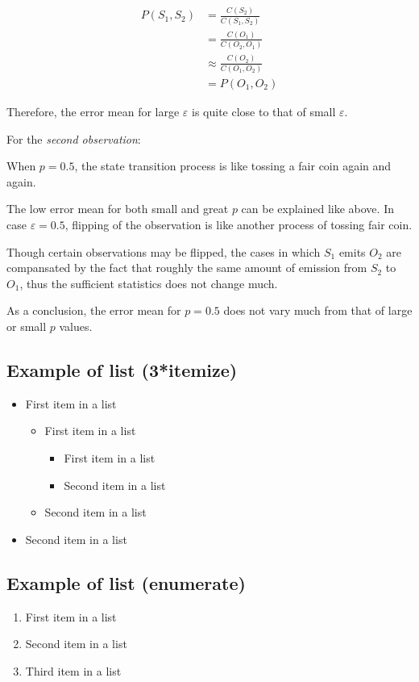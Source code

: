 \documentclass[paper=a4, fontsize=11pt]{scrartcl} %
\numberwithin{equation}{section} %
\numberwithin{figure}{section} %
\numberwithin{table}{section} %
\begin{document}
\begin {align*}
  P (S_1, S_2) &= \frac {C (S_2)} {C (S_1, S_2)} \\
  &= \frac {C (O_1)} {C (O_2, O_1)} \\
  &\approx \frac {C (O_2)} {C (O_1, O_2)}\\
  &=P (O_1, O_2)
\end {align*}

Therefore, the error mean for large $\varepsilon$ is quite close to that of small $\varepsilon$.\newline

For the {\em second observation}:\newline

When $p=0.5$, the state transition process is like tossing a fair coin again and again.

The low error mean for both small and great $p$ can be explained like above. In case $\varepsilon=0.5$, flipping of the observation is like another process of tossing fair coin.

Though certain observations may be flipped, the cases in which $S_1$ emits $O_2$ are compansated by the fact that roughly the same amount of emission from $S_2$ to $O_1$, thus the sufficient statistics does not change much.

As a conclusion, the error mean for $p=0.5$ does not vary much from that of large or small $p$ values.


\subsection{Example of list (3*itemize)}
\begin{itemize}
	\item First item in a list 
		\begin{itemize}
		\item First item in a list 
			\begin{itemize}
			\item First item in a list 
			\item Second item in a list 
			\end{itemize}
		\item Second item in a list 
		\end{itemize}
	\item Second item in a list 
\end{itemize}


\subsection{Example of list (enumerate)}
\begin{enumerate}
\item First item in a list 
\item Second item in a list 
\item Third item in a list
\end{enumerate}

\end{document}
